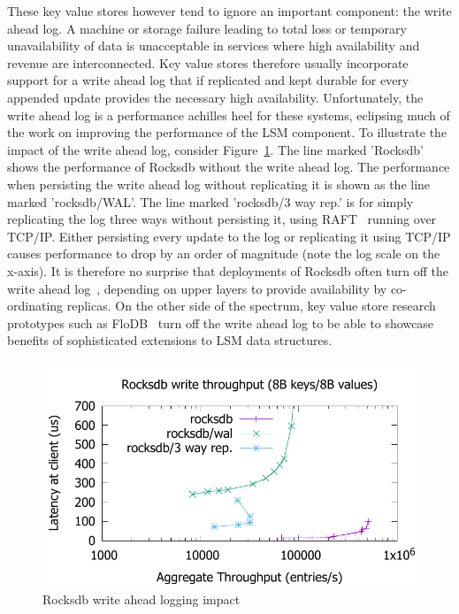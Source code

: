 \documentclass[pageno]{jpaper}
\begin{document}
These key value stores however tend to ignore an important component: the write
ahead log. A machine or storage failure leading to total loss or temporary
unavailability of data is unacceptable in services where high availability and
revenue are interconnected. Key value stores therefore usually incorporate
support for a write ahead log that if replicated and kept durable for every
appended update provides the necessary high availability. Unfortunately, the
write ahead log is a performance achilles heel for these systems, eclipsing much
of the work on improving the performance of the LSM component. To illustrate the
impact of the write ahead log, consider Figure~\ref{fig:problem}. The line
marked 'Rocksdb' shows the performance of Rocksdb without the write ahead
log. The performance when persisting the write ahead log without replicating it
is shown as the line marked 'rocksdb/WAL'. The line marked 'rocksdb/3 way rep.'
is for simply replicating the log three ways without persisting it, using
RAFT~\cite{raft} running over TCP/IP. Either persisting every update to the log
or replicating it using TCP/IP causes performance to drop by an order of
magnitude (note the log scale on the x-axis). It is therefore no surprise that
deployments of Rocksdb often turn off the write ahead log~\cite{samza},
depending on upper layers to provide availability by co-ordinating replicas. On
the other side of the spectrum, key value store research prototypes such as
FloDB~\cite{flodb} turn off the write ahead log to be able to showcase benefits
of sophisticated extensions to LSM data structures.


\begin{figure}
\centering \includegraphics[scale=0.6]{results2/problem.pdf}
\caption{Rocksdb write ahead logging impact}
\label{fig:problem}
\end{figure}
\end{document}

